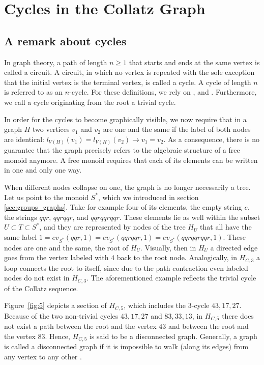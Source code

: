 \chapter{Cycles in the Collatz Graph}
\label{ch:cycles}

\section{A remark about cycles}
\label{sec:cycles}
In graph theory, a path of length $n\geq 1$ that starts and ends at the same vertex is called a circuit. A circuit, in which no vertex is repeated with the sole exception that the initial vertex is the terminal vertex, is called a cycle. A cycle of length $n$ is referred to as an $n$-cycle. For these definitions, we rely on \cite[p.~599]{Ref_Rosen}, \cite[p.~35]{Ref_Benjamin_Chartrand_Zhang} and \cite[p.~445]{Ref_Chartrand_Zhang}. Furthermore, we call a cycle originating from the root a trivial cycle.

\begin{remark}
In order for the cycles to become graphically visible, we now require that in a graph $H$ two vertices $v_1$ and $v_2$ are one and the same if the label of both nodes are identical: $l_{V(H)}(v_1)=l_{V(H)}(v_2)\rightarrow v_1=v_2$. As a consequence, there is no guarantee that the graph precisely refers to the algebraic structure of a free monoid anymore. A free monoid requires that each of its elements can be written in one and only one way.
\end{remark}

When different nodes collapse on one, the graph is no longer necessarily a tree. Let us point to the monoid $S^\ast$, which we introduced in section \ref{sec:groups_graphs}. Take for example four of its elements, the empty string $e$, the strings $qqr$, $qqrqqr$, and $qqrqqrqqr$. These elements lie as well within the subset $U\subset T\subset S^\ast$, and they are represented by nodes of the tree $H_U$ that all have the same label $1=ev_{S^\ast}(qqr,1)=ev_{S^\ast}(qqrqqr,1)=ev_{S^\ast}(qqrqqrqqr,1)$. These nodes are one and the same, the root of $H_U$. Visually, then in $H_U$ a directed edge goes from the vertex labeled with $4$ back to the root node. Analogically, in $H_{C,3}$ a loop connects the root to itself, since due to the path contraction even labeled nodes do not exist in $H_{C,3}$. The  aforementioned example reflects the trivial cycle of the Collatz sequence.

Figure~\ref{fig:5} depicts a section of $H_{C,5}$, which includes the $3$-cycle $43,17,27$. Because of the two non-trivial cycles $43,17,27$ and $83,33,13$, in $H_{C,5}$ there does not exist a path between the root and the vertex $43$ and between the root and the vertex $83$. Hence, $H_{C,5}$ is said to be a disconnected graph. Generally, a graph is called a disconnected graph if it is impossible to walk (along its edges) from any vertex to any other \cite[pp.~46-47]{Ref_Benjamin_Chartrand_Zhang}.

